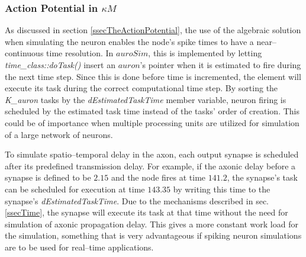 		\subsubsection{Action Potential in $\kappa M$}
		As discussed in section \ref{ssecTheActionPotential}, the use of the algebraic solution when simulating the neuron enables the node's spike times to have a near--continuous time resolution.
		In $auroSim$, this is implemented by letting \emph{time\_class::doTask()} insert an $auron$'s pointer when it is estimated to fire during the next time step.
		Since this is done before time is incremented, the element will execute its task during the correct computational time step. %
		By sorting the \emph{K\_auron} tasks by the \emph{dEstimatedTaskTime} member variable, neuron firing is scheduled by the estimated task time instead of the tasks' order of creation.
		This could be of importance when multiple processing units are utilized for simulation of a large network of neurons.

		To simulate spatio--temporal delay in the axon, each output synapse is scheduled after its predefined transmission delay.
		For example, if the axonic delay before a synapse is defined to be $2.15$ and the node fires at time $141.2$, the synapse's task can be scheduled for execution at time $143.35$ by writing this time to the synapse's \emph{dEstimatedTaskTime}.
		Due to the mechanisms described in sec. \ref{ssecTime}, the synapse will execute its task at that time without the need for simulation of axonic propagation delay.
		This gives a more constant work load for the simulation, something that is very advantageous if spiking neuron simulations are to be used for real--time applications.
	




